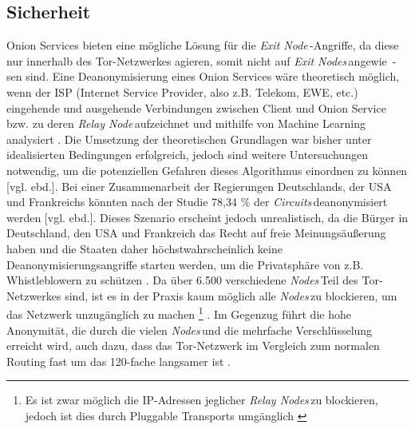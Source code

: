 \documentclass[a4paper,ngerman, headheight=28pt,12pt, footheight=27pt]{scrartcl}
\newcommand{\vcite}[1]{\cite[vgl.][]{#1}}
\newcommand{\vebd}{[vgl. ebd.]}
\newcommand{\relayn}{\textit{Relay Node\,}}
\newcommand{\relayns}{\textit{Relay Nodes\,}}
\newcommand{\exitn}{\textit{Exit Node\,}}
\newcommand{\exitns}{\textit{Exit Nodes\,}}
\newcommand{\nodes}{\textit{Nodes\,}}
\newcommand{\circuits}{\textit{Circuits\,}}
\begin{document}
\subsection{Sicherheit}
Onion Services bieten eine mögliche Lösung für die \exitn-Angriffe, da diese nur innerhalb des Tor-Netzwerkes agieren, somit nicht auf \exitns angewie~-sen sind.
Eine Deanonymisierung eines Onion Services wäre theoretisch möglich, wenn der ISP (Internet Service Provider, also z.B. Telekom, EWE, etc.) eingehende und ausgehende Verbindungen zwischen Client und Onion Service bzw. zu deren \relayn aufzeichnet und mithilfe von Machine Learning analysiert \vcite{OnionServiceFingerprinting}. Die Umsetzung der theoretischen Grundlagen war bisher unter idealisierten Bedingungen erfolgreich, jedoch sind weitere Untersuchungen notwendig, um die potenziellen Gefahren dieses Algorithmus einordnen zu können \vebd. Bei einer Zusammenarbeit der Regierungen Deutschlands, der USA und Frankreichs könnten nach der Studie 78,34 \% der \circuits deanonymisiert werden \vebd.
Dieses Szenario erscheint jedoch unrealistisch, da die Bürger in Deutschland, den USA und Frankreich das Recht auf freie Meinungsäußerung haben und die Staaten daher höchstwahrscheinlich keine Deanonymisierungsangriffe starten werden, um die Privatsphäre von z.B. Whistleblowern zu schützen \vcite{AmnReport,ROG-USA}.
Da über 6.500 verschiedene \nodes Teil des Tor-Netzwerkes sind, ist es in der Praxis kaum möglich alle \nodes zu blockieren, um das Netzwerk unzugänglich zu machen \footnote{Es ist zwar möglich die IP-Adressen jeglicher \relayns zu blockieren, jedoch ist dies durch Pluggable Transports umgänglich \vcite{PluggableTransports}} \vcite{DeanonymizingTorBook}.
Im Gegenzug führt die hohe Anonymität, die durch die vielen \nodes und die mehrfache Verschlüsselung erreicht wird, auch dazu, dass das Tor-Netzwerk im Vergleich zum normalen Routing fast um das 120-fache langsamer ist \vcite{TorPerformance}.

\end{document}
